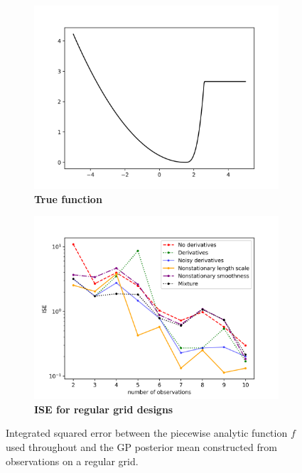\documentclass{article}
\begin{document}
\begin{figure}
		\centering
		\captionsetup{justification=centering}
    \begin{subfigure}[b]{.5\textwidth}
      \centering
      \includegraphics[scale=0.4]{figures/kink.png}
      \caption{\textbf{True function}}
    \end{subfigure}%
    \begin{subfigure}[b]{.5\textwidth}
      \centering
      \includegraphics[scale=0.4]{figures/regular-1D-all.png}
      \caption{\textbf{ISE for regular grid designs}}
    \end{subfigure}
		\caption{Integrated squared error between the piecewise analytic function $f$ used throughout and the GP posterior mean constructed from observations on a regular grid.}
		\label{regular-1D}
\end{figure}
\end{document}
